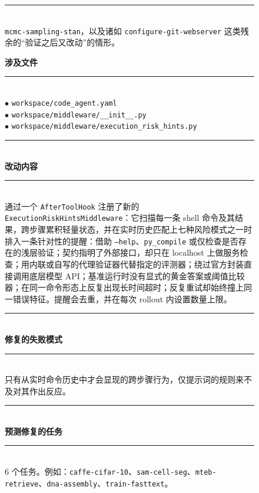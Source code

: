 \begin{figure}[t]
\begin{tcbraster}
\begin{tcolorbox}[colback=aheSky!18,colframe=aheNavy,colbacktitle=aheNavy,
                          title={\scriptsize\textbf{chg-1，迭代 6，commit \texttt{ff0cf3d}，层级：工具实现}}]
            \rule{\linewidth}{0.3pt}\\[1pt]
            \texttt{mcmc-sampling-stan}，以及诸如 \texttt{configure-git-webserver} 这类残余的``验证之后又改动''的情形。
        \end{tcolorbox}
        \begin{tcolorbox}[colback=aheTeal!12,colframe=aheBlue,colbacktitle=aheBlue,
                          title={\scriptsize\textbf{chg-2，迭代 6，commit \texttt{9651986}，层级：中间件}}]
            \textbf{\textcolor{aheBlue}{涉及文件}} \\
            \rule{\linewidth}{0.3pt}\\[1pt]
            $\bullet$ \texttt{workspace/code\_agent.yaml} \\
            $\bullet$ \texttt{workspace/middleware/\_\_init\_\_.py} \\
            $\bullet$ \texttt{workspace/middleware/execution\_risk\_hints.py} \\[3pt]
            \rule{\linewidth}{0.3pt}\\
            \textbf{\textcolor{aheBlue}{改动内容}} \\
            \rule{\linewidth}{0.3pt}\\[1pt]
            通过一个 \texttt{AfterToolHook} 注册了新的 \texttt{ExecutionRiskHintsMiddleware}：它扫描每一条 shell 命令及其结果，跨步骤累积轻量状态，并在实时历史匹配上七种风险模式之一时排入一条针对性的提醒：借助 \texttt{--help}、\texttt{py\_compile} 或仅检查是否存在的浅层验证；契约指明了外部接口，却只在 localhost 上做服务检查；用内联或自写的代理验证器代替指定的评测器；绕过官方封装直接调用底层模型 API；基准运行时没有显式的黄金答案或阈值比较器；在同一命令形态上反复出现长时间超时；反复重试却始终撞上同一错误特征。提醒会去重，并在每次 rollout 内设置数量上限。 \\[3pt]
            \rule{\linewidth}{0.3pt}\\
            \textbf{\textcolor{aheBlue}{修复的失败模式}} \\
            \rule{\linewidth}{0.3pt}\\[1pt]
            只有从实时命令历史中才会显现的跨步骤行为，仅提示词的规则来不及对其作出反应。 \\[3pt]
            \rule{\linewidth}{0.3pt}\\
            \textbf{\textcolor{aheBlue}{预测修复的任务}} \\
            \rule{\linewidth}{0.3pt}\\[1pt]
            6 个任务。例如：\texttt{caffe-cifar-10}、\texttt{sam-cell-seg}、\texttt{mteb-retrieve}、\texttt{dna-assembly}、\texttt{train-fasttext}。

\end{tcolorbox}
\end{tcbraster}
\end{figure}
